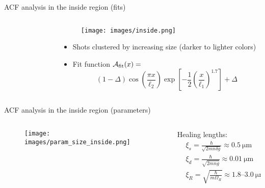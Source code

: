 \documentclass[aspectratio=169]{beamer}
\begin{document}

\begin{frame}{ACF analysis in the inside region (fits)}
  \begin{columns}
    \begin{column}{0.50\textwidth}
      \begin{figure}
        \centering
      \end{figure}
    \end{column}
    \begin{column}{0.50\textwidth}
      \begin{figure}
        \centering
        \texttt{[image: images/inside.png]}
      \end{figure}
      \begin{itemize}
        \item Shots clustered by increasing size (darker to lighter colors)
        \item Fit function $\mathcal{A}_{\rm fit}(x) = $
        \begin{equation*}
          (1 - \Delta)\cos(\frac{\pi x}{\ell_2})\exp[-\frac{1}{2}\left(\frac{x}{\ell_1}\right)^{1.7}] + \Delta
        \end{equation*}
      \end{itemize}
    \end{column}
  \end{columns}
\end{frame}

\begin{frame}{ACF analysis in the inside region (parameters)}
  \begin{columns}
    \begin{column}{0.7\textwidth}
      \begin{figure}
        \centering
        \texttt{[image: images/param\_size\_inside.png]}
      \end{figure}
    \end{column}
    \begin{column}{0.3\textwidth}
      Healing lengths:
      \begin{align*}
        &\xi_s = \frac{\hbar}{\sqrt{2mn\delta g}} \approx 0.5\ \unit{\micro\meter}\\
        &\xi_d = \frac{\hbar}{\sqrt{2mn\overline{g}}} \approx 0.01\ \unit{\micro\meter}\\
        &\xi_R = \sqrt{\frac{\hbar}{m\Omega_R}} \approx \numrange[range-phrase=-]{1.8}{3.0}\ \unit{\micro\meter}
      \end{align*}
    \end{column}
  \end{columns}
\end{frame}
\end{document}
